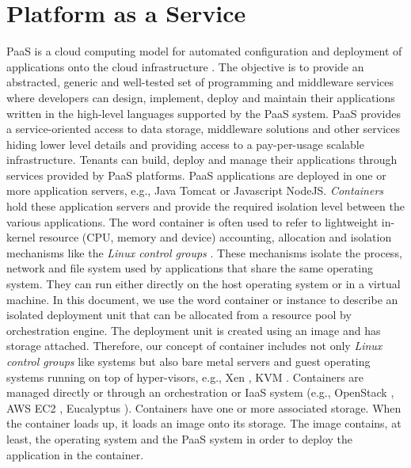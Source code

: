 \section{Platform as a Service}
\label{sec:arch:paas}
\acf{PaaS} is a cloud computing model for automated configuration and deployment of applications onto the cloud infrastructure \cite{Vaquero2008,Vaquero2011,Armbrust,Mell}. The objective is to provide an abstracted, generic and well-tested set of programming and middleware services where developers can design, implement, deploy and maintain their applications written in the high-level languages supported by the \ac{PaaS} system. \ac{PaaS} provides a service-oriented access to data storage, middleware solutions and other services hiding lower level details and providing access to a pay-per-usage scalable infrastructure. Tenants can build, deploy and manage their applications through services provided by \ac{PaaS} platforms. 
\acl{PaaS} applications are deployed in one or more application servers, e.g., Java Tomcat or Javascript NodeJS. \emph{Containers} \cite{Lenk2009} hold these application servers and provide the required isolation level between the various applications. The word container is often used to refer to lightweight in-kernel resource (CPU, memory and device) accounting, allocation and isolation mechanisms like the \textit{Linux control groups} \cite{Menage2007}. These mechanisms isolate the process, network and file system used by applications that share the same operating system. They can run either directly on the host operating system or in a virtual machine. In this document, we use the word container or instance to describe an isolated deployment unit that can be allocated from a resource pool by orchestration engine. The deployment unit is created using an image and has storage attached. Therefore, our concept of container includes not only \textit{Linux control groups} like systems but also bare metal servers and guest operating systems running on top of hyper-visors, e.g., Xen \cite{xen}, KVM \cite{kvm}. Containers are managed directly or through an orchestration or IaaS system (e.g., OpenStack \cite{openstack}, \ac{AWS} \ac{EC2} \cite{aws}, Eucalyptus \cite{eucalyptus}). Containers have one or more associated storage. When the container loads up, it loads an image onto its storage. The image contains, at least, the operating system and the \ac{PaaS} system in order to deploy the application in the container. 

